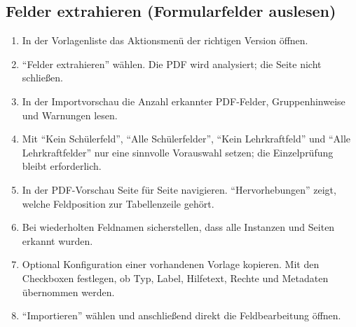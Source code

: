 \documentclass[12pt,a4paper]{article}
\begin{document}
\subsection{Felder extrahieren (Formularfelder auslesen)}\label{sec:felder-extrahieren}
\begin{enumerate}
  \item In der Vorlagenliste das Aktionsmenü der richtigen Version öffnen.
  \item \enquote{Felder extrahieren} wählen. Die PDF wird analysiert; die Seite nicht schließen.
  \item In der Importvorschau die Anzahl erkannter PDF-Felder, Gruppenhinweise und Warnungen lesen.
  \item Mit \enquote{Kein Schülerfeld}, \enquote{Alle Schülerfelder}, \enquote{Kein Lehrkraftfeld} und \enquote{Alle Lehrkraftfelder} nur eine sinnvolle Vorauswahl setzen; die Einzelprüfung bleibt erforderlich.
  \item In der PDF-Vorschau Seite für Seite navigieren. \enquote{Hervorhebungen} zeigt, welche Feldposition zur Tabellenzeile gehört.
  \item Bei wiederholten Feldnamen sicherstellen, dass alle Instanzen und Seiten erkannt wurden.
  \item Optional Konfiguration einer vorhandenen Vorlage kopieren. Mit den Checkboxen festlegen, ob Typ, Label, Hilfetext, Rechte und Metadaten übernommen werden.
  \item \enquote{Importieren} wählen und anschließend direkt die Feldbearbeitung öffnen.
\end{enumerate}
\end{document}
